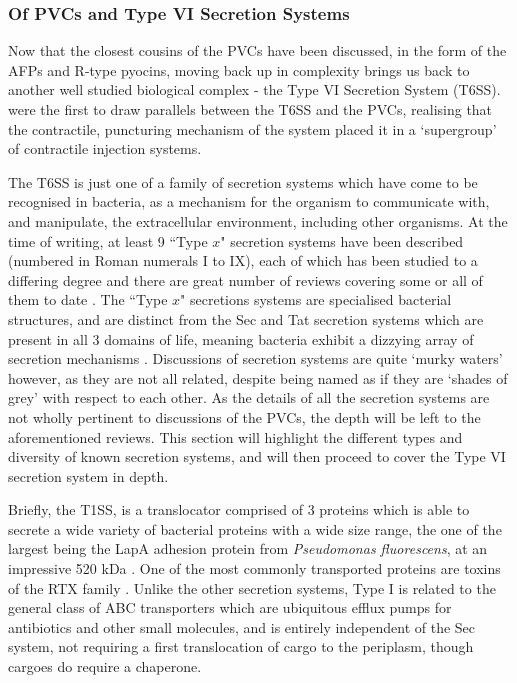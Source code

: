 \subsubsection{Of PVCs and Type VI Secretion Systems}\label{t6ss}
Now that the closest cousins of the PVCs have been discussed, in the form of the AFPs and R-type pyocins, moving back up in complexity brings us back to another well studied biological complex - the Type VI Secretion System (T6SS). \cite{Bonemann2010} were the first to draw parallels between the T6SS and the PVCs, realising that the contractile, puncturing mechanism of the system placed it in a `supergroup' of contractile injection systems.

 The T6SS is just one of a family of secretion systems which have come to be recognised in bacteria, as a mechanism for the organism to communicate with, and manipulate, the extracellular environment, including other organisms. At the time of writing, at least 9 ``Type \textbf{$x$}" secretion systems have been described (numbered in Roman numerals I to IX), each of which has been studied to a differing degree and there are great number of reviews covering some or all of them to date \citep{Dalbey2012,Chang2014a, Bleves2010, Desvaux2009, Abby2016, Costa2015, Goulet2004, Remaut2008, Gerlach2007, Abdallah2007, Green2015}. The ``Type \textbf{$x$}" secretions systems are specialised bacterial structures, and are distinct from the Sec and Tat secretion systems which are present in all 3 domains of life, meaning bacteria exhibit a dizzying array of secretion mechanisms \citep{Green2015}. Discussions of secretion systems are quite `murky waters' however, as they are not all related, despite being named as if they are `shades of grey' with respect to each other. As the details of all the secretion systems are not wholly pertinent to discussions of the PVCs, the depth will be left to the aforementioned reviews. This section will highlight the different types and diversity of known secretion systems, and will then proceed to cover the Type VI secretion system in depth.

Briefly, the T1SS, is a translocator comprised of 3 proteins which is able to secrete a wide variety of bacterial proteins with a wide size range, the one of the largest being the LapA adhesion protein from \emph{Pseudomonas fluorescens}, at an impressive 520 kDa \citep{Boyd2014}. One of the most commonly transported proteins are toxins of the RTX family \citep{Delepelaire2004}. Unlike the other secretion systems, Type I is related to the general class of ABC transporters which are ubiquitous efflux pumps for antibiotics and other small molecules, and is entirely independent of the Sec system, not requiring a first translocation of cargo to the periplasm, though cargoes do require a chaperone.

